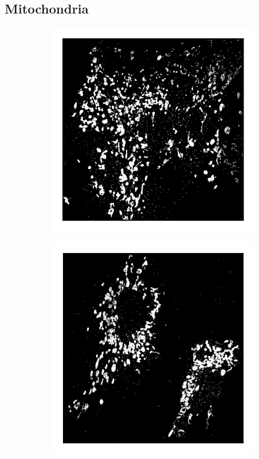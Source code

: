\subsection{Mitochondria}
\begin{figure}
    \begin{subfigure}{0.32\textwidth}
        \includegraphics[width=\textwidth]{figures/mitochondria_image6.png}
        \caption{}
    \end{subfigure}
    \begin{subfigure}{0.32\textwidth}
        \includegraphics[width=\textwidth]{figures/mitochondria_image4.png}

\end{subfigure}
\end{figure}
